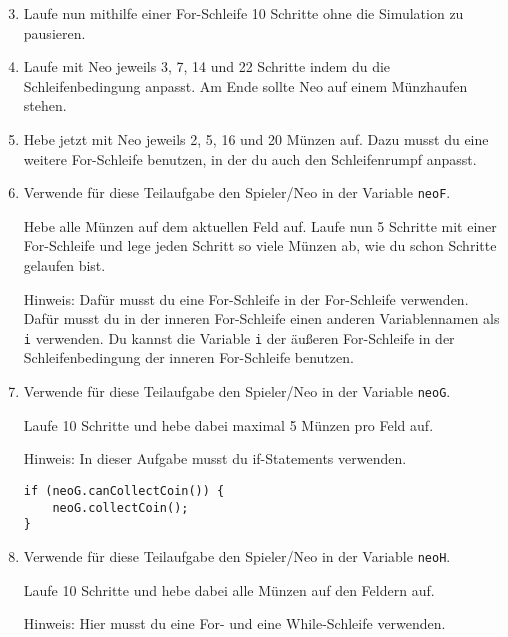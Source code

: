 \begin{enumerate}\setcounter{enumi}{2}
	\item 
		Laufe nun mithilfe einer For-Schleife 10 Schritte ohne die Simulation zu pausieren.

	\item
		Laufe mit Neo jeweils 3, 7, 14 und 22 Schritte indem du die Schleifenbedingung anpasst.
		Am Ende sollte Neo auf einem Münzhaufen stehen.

	\item
		Hebe jetzt mit Neo jeweils 2, 5, 16 und 20 Münzen auf.
		Dazu musst du eine weitere For-Schleife benutzen, in der du auch den Schleifenrumpf anpasst.

	\item
		Verwende für diese Teilaufgabe den Spieler/Neo in der Variable \lstinline{neoF}.

		Hebe alle Münzen auf dem aktuellen Feld auf. 
		Laufe nun 5 Schritte mit einer For-Schleife und lege jeden Schritt so viele Münzen ab, wie du schon Schritte gelaufen bist.

		Hinweis: Dafür musst du eine For-Schleife in der For-Schleife verwenden. 
		Dafür musst du in der inneren For-Schleife einen anderen Variablennamen als \lstinline{i} verwenden.
		Du kannst die Variable \lstinline{i} der äußeren For-Schleife in der Schleifenbedingung der inneren For-Schleife benutzen.

	\item
		Verwende für diese Teilaufgabe den Spieler/Neo in der Variable \lstinline{neoG}.

		Laufe 10 Schritte und hebe dabei maximal 5 Münzen pro Feld auf.

		Hinweis: In dieser Aufgabe musst du if-Statements verwenden.

		\begin{lstlisting}
if (neoG.canCollectCoin()) {
    neoG.collectCoin();
}
		\end{lstlisting}

	\item
		Verwende für diese Teilaufgabe den Spieler/Neo in der Variable \lstinline{neoH}.

		Laufe 10 Schritte und hebe dabei alle Münzen auf den Feldern auf.

		Hinweis: Hier musst du eine For- und eine While-Schleife verwenden.
\end{enumerate}
\newpage

